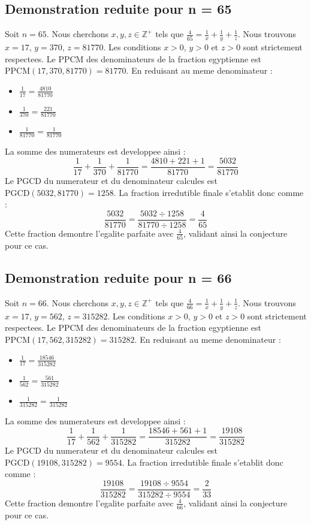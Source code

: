 \documentclass[11pt,a4paper]{article}
\begin{document}
\subsection{Demonstration reduite pour n = 65}
Soit $n = 65$. Nous cherchons $x, y, z \in \mathbb{Z}^{+}$ tels que $\frac{4}{65} = \frac{1}{x} + \frac{1}{y} + \frac{1}{z}$.
Nous trouvons $x = 17$, $y = 370$, $z = 81770$.
Les conditions $x > 0$, $y > 0$ et $z > 0$ sont strictement respectees.
Le PPCM des denominateurs de la fraction egyptienne est $\text{PPCM}(17, 370, 81770) = 81770$.
En reduisant au meme denominateur :
\begin{itemize}
    \item $\frac{1}{17} = \frac{4810}{81770}$
    \item $\frac{1}{370} = \frac{221}{81770}$
    \item $\frac{1}{81770} = \frac{1}{81770}$
\end{itemize}
La somme des numerateurs est developpee ainsi :
$$ \frac{1}{17} + \frac{1}{370} + \frac{1}{81770} = \frac{4810 + 221 + 1}{81770} = \frac{5032}{81770} $$
Le PGCD du numerateur et du denominateur calcules est $\text{PGCD}(5032, 81770) = 1258$.
La fraction irredutible finale s'etablit donc comme :
$$ \frac{5032}{81770} = \frac{5032 \div 1258}{81770 \div 1258} = \frac{4}{65} $$
Cette fraction demontre l'egalite parfaite avec $\frac{4}{65}$, validant ainsi la conjecture pour ce cas.

\subsection{Demonstration reduite pour n = 66}
Soit $n = 66$. Nous cherchons $x, y, z \in \mathbb{Z}^{+}$ tels que $\frac{4}{66} = \frac{1}{x} + \frac{1}{y} + \frac{1}{z}$.
Nous trouvons $x = 17$, $y = 562$, $z = 315282$.
Les conditions $x > 0$, $y > 0$ et $z > 0$ sont strictement respectees.
Le PPCM des denominateurs de la fraction egyptienne est $\text{PPCM}(17, 562, 315282) = 315282$.
En reduisant au meme denominateur :
\begin{itemize}
    \item $\frac{1}{17} = \frac{18546}{315282}$
    \item $\frac{1}{562} = \frac{561}{315282}$
    \item $\frac{1}{315282} = \frac{1}{315282}$
\end{itemize}
La somme des numerateurs est developpee ainsi :
$$ \frac{1}{17} + \frac{1}{562} + \frac{1}{315282} = \frac{18546 + 561 + 1}{315282} = \frac{19108}{315282} $$
Le PGCD du numerateur et du denominateur calcules est $\text{PGCD}(19108, 315282) = 9554$.
La fraction irredutible finale s'etablit donc comme :
$$ \frac{19108}{315282} = \frac{19108 \div 9554}{315282 \div 9554} = \frac{2}{33} $$
Cette fraction demontre l'egalite parfaite avec $\frac{4}{66}$, validant ainsi la conjecture pour ce cas.
\end{document}
